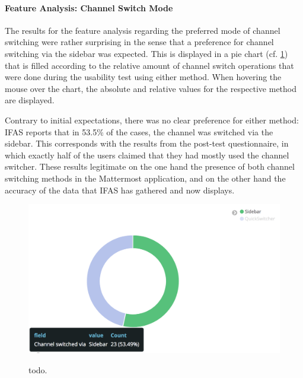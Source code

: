 %
%
%
%


\paragraph{Feature Analysis: Channel Switch Mode} 

The results for the feature analysis regarding the preferred mode of channel switching were rather surprising in the sense that a preference for channel switching via the sidebar was expected.
This is displayed in a pie chart (cf. \cref{figure:evaluation:user:visualization-feature-analysis}) that is filled according to the relative amount of channel switch operations that were done during the usability test using either method.
When hovering the mouse over the chart, the absolute and relative values for the respective method are displayed.

Contrary to initial expectations, there was no clear preference for either method: \ac{IFAS} reports that in 53.5\% of the cases, the channel was switched via the sidebar.
This corresponds with the results from the post-test questionnaire, in which exactly half of the users claimed that they had mostly used the channel switcher.
These results legitimate on the one hand the presence of both channel switching methods in the Mattermost application, and on the other hand the accuracy of the data that \ac{IFAS} has gathered and now displays.

\begin{figure}[h]
        \caption{todo.}
        \includegraphics[width=1.1\textwidth]{gfx/visualization-feature-analysis.png}
        \label{figure:evaluation:user:visualization-feature-analysis}
\end{figure}

